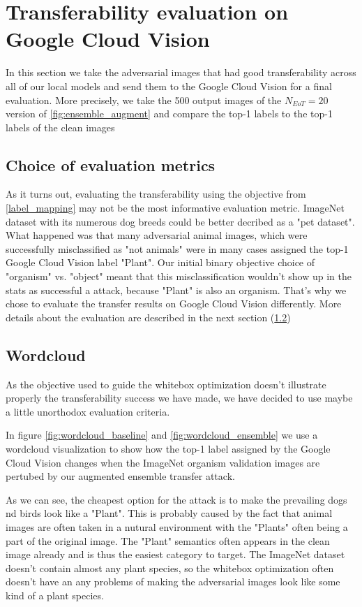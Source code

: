 \section{Transferability evaluation on Google Cloud Vision}
In this section we take the adversarial images that had good transferability across all of our local models and send them to the Google Cloud Vision for a final evaluation. More precisely, we take the 500 output images of the $N_{EoT} = 20$ version of \ref{fig:ensemble_augment} and compare the top-1 labels to the top-1 labels of the clean images

\subsection{Choice of evaluation metrics}
As it turns out, evaluating the transferability using the objective from \ref{label_mapping} may not be the most informative evaluation metric. ImageNet dataset with its numerous dog breeds could be better decribed as a "pet dataset". What happened was that many adversarial animal images, which were successfully misclassified as "not animals" were in many cases assigned the top-1 Google Cloud Vision label "Plant". Our initial binary objective choice of "organism" vs. "object" meant that this misclassification wouldn't show up in the stats as successful a attack, because "Plant" is also an organism. That's why we chose to evaluate the transfer results on Google Cloud Vision differently. More details about the evaluation are described in the next section (\ref{gvision_wordcloud})


\pagebreak
\subsection{Wordcloud}
\label{gvision_wordcloud}
As the objective used to guide the whitebox optimization doesn't illustrate properly the transferability success we have made, we have decided to use maybe a little unorthodox evaluation criteria.

In figure \ref{fig:wordcloud_baseline} and \ref{fig:wordcloud_ensemble} we use a wordcloud visualization to show how the top-1 label assigned by the Google Cloud Vision changes when the ImageNet organism validation images are pertubed by our augmented ensemble transfer attack.

As we can see, the cheapest option for the attack is to make the prevailing dogs nd birds look like a "Plant". This is probably caused by the fact that animal images are often taken in a nutural environment with the "Plants" often being a part of the original image. The "Plant" semantics often appears in the clean image already and is thus the easiest category to target. The ImageNet dataset doesn't contain almost any plant species, so the whitebox optimization often doesn't have an any problems of making the adversarial images look like some kind of a plant species.


